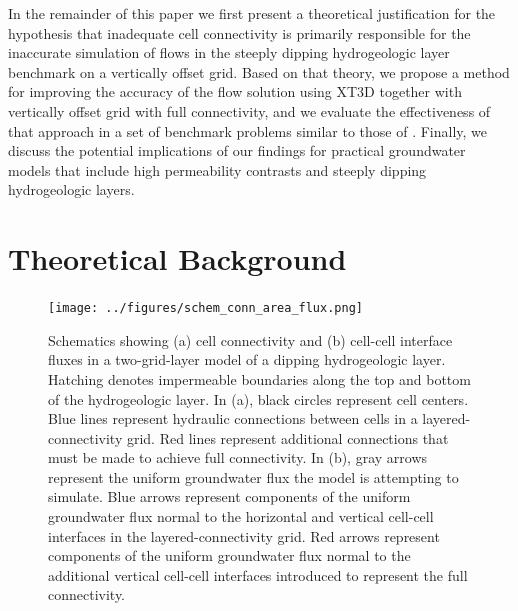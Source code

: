 \documentclass{article}
\begin{document}
In the remainder of this paper we first present a theoretical justification for the hypothesis that inadequate cell connectivity is primarily responsible for the inaccurate simulation of flows in the steeply dipping hydrogeologic layer benchmark on a vertically offset grid. Based on that theory, we propose a method for improving the accuracy of the flow solution using XT3D together with vertically offset grid with full connectivity, and we evaluate the effectiveness of that approach in a set of benchmark problems similar to those of \cite{bardot2022}. Finally, we discuss the potential implications of our findings for practical groundwater models that include high permeability contrasts and steeply dipping hydrogeologic layers.

\section{Theoretical Background}

\begin{figure}
	\begin{center}
	\texttt{[image: ../figures/schem\_conn\_area\_flux.png]}
	\caption{Schematics showing (a) cell connectivity and (b) cell-cell interface fluxes in a two-grid-layer model of a dipping hydrogeologic layer. Hatching denotes impermeable boundaries along the top and bottom of the hydrogeologic layer. In (a), black circles represent cell centers. Blue lines represent hydraulic connections between cells in a layered-connectivity grid. Red lines represent additional connections that must be made to achieve full connectivity. In (b), gray arrows represent the uniform groundwater flux the model is attempting to simulate. Blue arrows represent components of the uniform groundwater flux normal to the horizontal and vertical cell-cell interfaces in the layered-connectivity grid. Red arrows represent components of the uniform groundwater flux normal to the additional vertical cell-cell interfaces introduced to represent the full connectivity.}
	\label{fig:schem-conn-area-flux}
	\end{center}
\end{figure}
\end{document}

